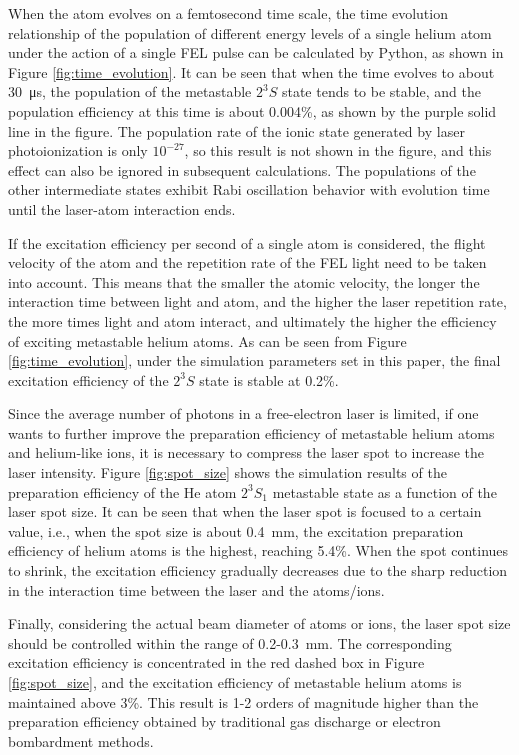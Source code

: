 \documentclass[12pt,a4paper]{article}
\begin{document}
When the atom evolves on a femtosecond time scale, the time evolution relationship of the population of different energy levels of a single helium atom under the action of a single FEL pulse can be calculated by Python, as shown in Figure \ref{fig:time_evolution}. It can be seen that when the time evolves to about \SI{30}{\micro s}, the population of the metastable $2^3S$ state tends to be stable, and the population efficiency at this time is about 0.004\%, as shown by the purple solid line in the figure. The population rate of the ionic state generated by laser photoionization is only $10^{-27}$, so this result is not shown in the figure, and this effect can also be ignored in subsequent calculations. The populations of the other intermediate states exhibit Rabi oscillation behavior with evolution time until the laser-atom interaction ends.

If the excitation efficiency per second of a single atom is considered, the flight velocity of the atom and the repetition rate of the FEL light need to be taken into account. This means that the smaller the atomic velocity, the longer the interaction time between light and atom, and the higher the laser repetition rate, the more times light and atom interact, and ultimately the higher the efficiency of exciting metastable helium atoms. As can be seen from Figure \ref{fig:time_evolution}, under the simulation parameters set in this paper, the final excitation efficiency of the $2^3S$ state is stable at 0.2\%.

Since the average number of photons in a free-electron laser is limited, if one wants to further improve the preparation efficiency of metastable helium atoms and helium-like ions, it is necessary to compress the laser spot to increase the laser intensity. Figure \ref{fig:spot_size} shows the simulation results of the preparation efficiency of the He atom $2^3S_1$ metastable state as a function of the laser spot size. It can be seen that when the laser spot is focused to a certain value, i.e., when the spot size is about \SI{0.4}{mm}, the excitation preparation efficiency of helium atoms is the highest, reaching 5.4\%. When the spot continues to shrink, the excitation efficiency gradually decreases due to the sharp reduction in the interaction time between the laser and the atoms/ions.

Finally, considering the actual beam diameter of atoms or ions, the laser spot size should be controlled within the range of 0.2-\SI{0.3}{mm}. The corresponding excitation efficiency is concentrated in the red dashed box in Figure \ref{fig:spot_size}, and the excitation efficiency of metastable helium atoms is maintained above 3\%. This result is 1-2 orders of magnitude higher than the preparation efficiency obtained by traditional gas discharge or electron bombardment methods.
\end{document}
